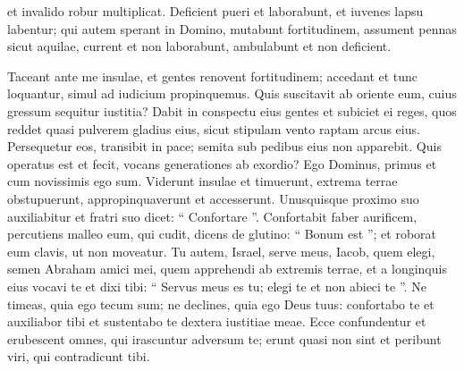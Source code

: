 \begin{biblechapter}
\begin{biblechapter}
\begin{biblechapter}
\begin{biblechapter}
\begin{biblechapter}
\begin{biblechapter}
\begin{biblechapter}
\begin{biblechapter}
\begin{biblechapter}
\begin{biblechapter}
\begin{biblechapter}
\begin{biblechapter}
\begin{biblechapter}
\begin{biblechapter}
\begin{biblechapter}
\begin{biblechapter}
\begin{biblechapter}
\begin{biblechapter}
\begin{biblechapter}
\begin{biblechapter}
\begin{biblechapter}
\begin{biblechapter}
\begin{biblechapter}
\begin{biblechapter}
\begin{biblechapter}
\begin{biblechapter}
\begin{biblechapter}
\begin{biblechapter}
\begin{biblechapter}
\begin{biblechapter}
\begin{biblechapter}
\begin{biblechapter}
\begin{biblechapter}
\begin{biblechapter}
\begin{biblechapter}
\begin{biblechapter}
\begin{biblechapter}
\begin{biblechapter}
\begin{biblechapter}
\begin{biblechapter}
 et invalido robur multiplicat.
 \verse Deficient pueri et laborabunt,
 et iuvenes lapsu labentur;
 \verse qui autem sperant in Domino,
 mutabunt fortitudinem,
 assument pennas sicut aquilae,
 current et non laborabunt,
 ambulabunt et non deficient.
 
\begin{biblechapter}
\verse Taceant ante me insulae,
 et gentes renovent fortitudinem;
 accedant et tunc loquantur,
 simul ad iudicium propinquemus.
 \verse Quis suscitavit ab oriente eum,
 cuius gressum sequitur iustitia?
 Dabit in conspectu eius gentes
 et subiciet ei reges,
 quos reddet quasi pulverem gladius eius,
 sicut stipulam vento raptam arcus eius.
 \verse Persequetur eos, transibit in pace;
 semita sub pedibus eius non apparebit.
 \verse Quis operatus est et fecit,
 vocans generationes ab exordio?
 Ego Dominus, primus
 et cum novissimis ego sum.
 \verse Viderunt insulae et timuerunt,
 extrema terrae obstupuerunt,
 appropinquaverunt et accesserunt.
 \verse Unusquisque proximo suo auxiliabitur
 et fratri suo dicet: “ Confortare ”.
 \verse Confortabit faber aurificem,
 percutiens malleo eum, qui cudit,
 dicens de glutino: “ Bonum est ”;
 et roborat eum clavis,
 ut non moveatur.
 \verse Tu autem, Israel, serve meus,
 Iacob, quem elegi,
 semen Abraham amici mei,
 \verse quem apprehendi ab extremis terrae,
 et a longinquis eius vocavi te
 et dixi tibi: “ Servus meus es tu;
 elegi te et non abieci te ”.
 \verse Ne timeas, quia ego tecum sum;
 ne declines, quia ego Deus tuus:
 confortabo te et auxiliabor tibi
 et sustentabo te dextera iustitiae meae.
 \verse Ecce confundentur et erubescent
 omnes, qui irascuntur adversum te;
 erunt quasi non sint
 et peribunt viri, qui contradicunt tibi.

\end{biblechapter}
\end{biblechapter}
\end{biblechapter}
\end{biblechapter}
\end{biblechapter}
\end{biblechapter}
\end{biblechapter}
\end{biblechapter}
\end{biblechapter}
\end{biblechapter}
\end{biblechapter}
\end{biblechapter}
\end{biblechapter}
\end{biblechapter}
\end{biblechapter}
\end{biblechapter}
\end{biblechapter}
\end{biblechapter}
\end{biblechapter}
\end{biblechapter}
\end{biblechapter}
\end{biblechapter}
\end{biblechapter}
\end{biblechapter}
\end{biblechapter}
\end{biblechapter}
\end{biblechapter}
\end{biblechapter}
\end{biblechapter}
\end{biblechapter}
\end{biblechapter}
\end{biblechapter}
\end{biblechapter}
\end{biblechapter}
\end{biblechapter}
\end{biblechapter}
\end{biblechapter}
\end{biblechapter}
\end{biblechapter}
\end{biblechapter}
\end{biblechapter}
